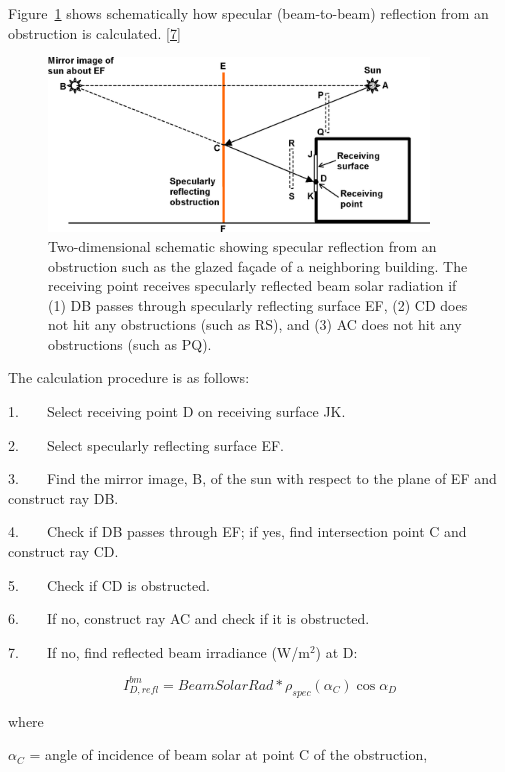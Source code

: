 Figure~\ref{fig:two-dimensional-schematic-showing-specular} shows schematically how specular (beam-to-beam) reflection from an obstruction is calculated. \protect\hyperlink{ux5fftn7}{{[}7{]}}

\begin{figure}[hbtp] %
\centering
\includegraphics[width=0.9\textwidth, height=0.9\textheight, keepaspectratio=true]{media/image703.png}
\caption{  Two-dimensional schematic showing specular reflection from an obstruction such as the glazed façade of a neighboring building. The receiving point receives specularly reflected beam solar radiation if (1) DB passes through specularly reflecting surface EF, (2) CD does not hit any obstructions (such as RS), and (3) AC does not hit any obstructions (such as PQ). \protect \label{fig:two-dimensional-schematic-showing-specular}}
\end{figure}

The calculation procedure is as follows:

1.~~~~Select receiving point D on receiving surface JK.

2.~~~~Select specularly reflecting surface EF.

3.~~~~Find the mirror image, B, of the sun with respect to the plane of EF and construct ray DB.

4.~~~~Check if DB passes through EF; if yes, find intersection point C and construct ray CD.

5.~~~~Check if CD is obstructed.

6.~~~~If no, construct ray AC and check if it is obstructed.

7.~~~~If no, find reflected beam irradiance (W/m\(^{2}\)) at D:

\begin{equation}
I_{D,refl}^{bm} = BeamSolarRad*{\rho_{spec}}({\alpha_C})\cos {\alpha_D}
\end{equation}

where

\({\alpha_C}\) = angle of incidence of beam solar at point C of the obstruction,

